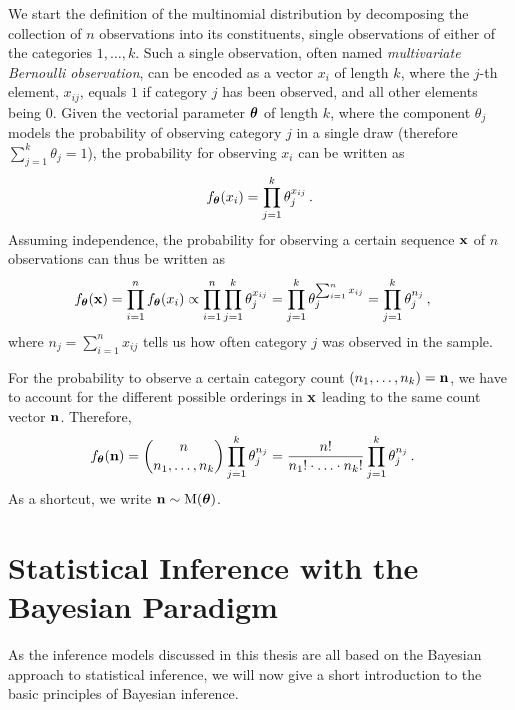 We start the definition of the multinomial distribution by decomposing the collection of $n$ observations into its constituents,
single observations of either of the categories $1,\ldots,k$.
Such a single observation, often named \emph{multivariate Bernoulli observation}, can be encoded as a vector $x_i$ of length $k$,
where the $j$-th element, $x_{ij}$, equals $1$ if category $j$ has been observed, and all other elements being $0$.
Given the vectorial parameter $\boldsymbol{\theta}$ of length $k$,
where the component $\theta_j$ models the probability of observing category $j$ in a single draw
(therefore $\sum_{j=1}^k \theta_j = 1$),
the probability for observing $x_i$ can be written as
\begin{align*}
f_{\boldsymbol{\theta}}(x_i) = \prod_{j=1}^k \theta_j^{x_{ij}}\,.
\end{align*}
Assuming independence, the probability for observing a certain sequence $\mathbf{x}$ of $n$ observations can thus be written as
\begin{align*}
f_{\boldsymbol{\theta}}(\mathbf{x}) &= \prod_{i=1}^n f_{\boldsymbol{\theta}}(x_i)
                \propto \prod_{i=1}^n \prod_{j=1}^k \theta_j^{x_{ij}}
                      = \prod_{j=1}^k \theta_j^{\sum_{i=1}^n x_{ij}}
                      = \prod_{j=1}^k \theta_j^{n_j}\,,
\end{align*}
where $n_j = \sum_{i=1}^n x_{ij}$ tells us how often category $j$ was observed in the sample.

For the probability to observe a certain category count $(n_1, \ldots, n_k) = \mathbf{n}$,
we have to account for the different possible orderings in $\mathbf{x}$ leading to the same count vector $\mathbf{n}$.
Therefore,
\begin{align}\label{eq:multinomdens}
f_{\boldsymbol{\theta}}(\mathbf{n}) &= \binom{n}{n_1,\ldots,n_k} \prod_{j=1}^k \theta_j^{n_j}
                      = \frac{n!}{n_1!\cdot \ldots \cdot n_k!} \prod_{j=1}^k \theta_j^{n_j}\,.
\end{align}
As a shortcut, we write $\mathbf{n} \sim \operatorname{M}(\boldsymbol{\theta})$.


\section{Statistical Inference with the Bayesian Paradigm}
\label{sec:bayes-inference}

As the inference models discussed in this thesis are all based on the Bayesian approach to statistical inference,
we will now give a short introduction to the basic principles of Bayesian inference.

